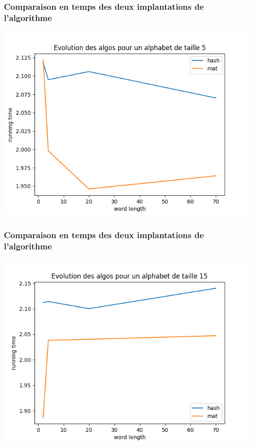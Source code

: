 \documentclass{beamer}
\begin{document}
  \begin{frame}
    \frametitle{Comparaison en temps des deux implantations de l'algorithme}
    \begin{center}
      \includegraphics[scale = 0.5]{../Courbes/word_5.png}
    \end{center}
  \end{frame}

  \begin{frame}
    \frametitle{Comparaison en temps des deux implantations de l'algorithme}
    \begin{center}
      \includegraphics[scale = 0.5]{../Courbes/word_15.png}
    \end{center}
  \end{frame}
\end{document}

